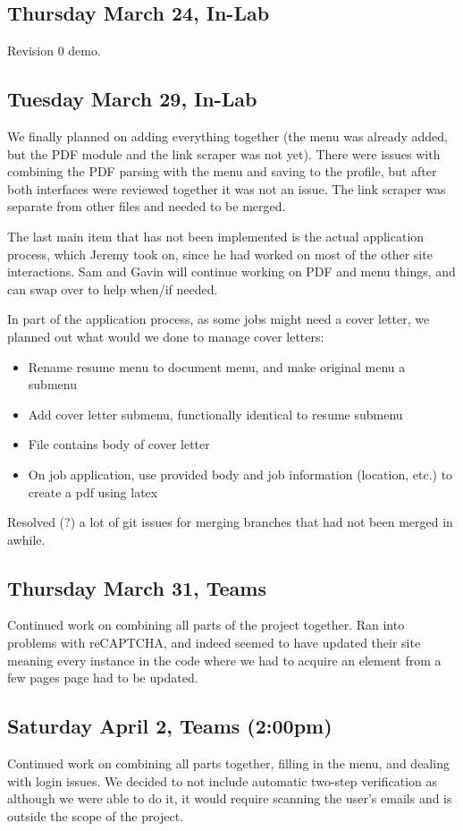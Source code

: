 \documentclass{article}
\begin{document}
\subsection{Thursday March 24, In-Lab}
Revision 0 demo.

\subsection{Tuesday March 29, In-Lab}
We finally planned on adding everything together (the menu was already added, but the PDF module and the link scraper was not yet). There were issues with combining the PDF parsing with the menu and saving to the profile, but after both interfaces were reviewed together it was not an issue. The link scraper was separate from other files and needed to be merged. 

The last main item that has not been implemented is the actual application process, which Jeremy took on, since he had worked on most of the other site interactions. Sam and Gavin will continue working on PDF and menu things, and can swap over to help when/if needed.

In part of the application process, as some jobs might need a cover letter, we planned out what would we done to manage cover letters:
\begin{itemize}
	\item Rename resume menu to document menu, and make original menu a submenu
	\item Add cover letter submenu, functionally identical to resume submenu
	\item File contains body of cover letter
	\item On job application, use provided body and job information (location, etc.) to create a pdf using latex
\end{itemize} 

Resolved (?) a lot of git issues for merging branches that had not been merged in awhile.

\subsection{Thursday March 31, Teams}
Continued work on combining all parts of the project together. Ran into problems with reCAPTCHA, and indeed seemed to have updated their site meaning every instance in the code where we had to acquire an element from a few pages page had to be updated.

\subsection{Saturday April 2, Teams (2:00pm)}
Continued work on combining all parts together, filling in the menu, and dealing with login issues. We decided to not include automatic two-step verification as although we were able to do it, it would require scanning the user's emails and is outside the scope of the project. 
\end{document}
